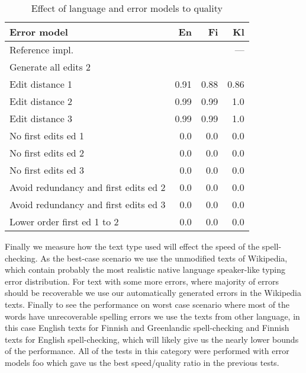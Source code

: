 \documentclass[11pt]{article}
\begin{document}
\begin{table}[h]
\begin{center}
\begin{scriptsize}
\begin{tabular}{|l|rrr|}
\hline
\bf Error model & \bf En & \bf Fi & \bf Kl\\ 
\hline
Reference impl.   & & & --- \\
Generate all edits 2 &
\\
\hline
Edit distance 1 &
0.91&0.88&0.86
\\
Edit distance 2 &
0.99&0.99&1.0
\\
Edit distance 3 &
0.99&0.99&1.0
\\
No first edits ed 1 & 
0.0&0.0&0.0
\\
No first edits ed 2 &
0.0&0.0&0.0
\\
No first edits ed 3 &
0.0&0.0&0.0
\\
Avoid redundancy and first edits ed 2 &
0.0&0.0&0.0
\\
Avoid redundancy and first edits ed 3 &
0.0&0.0&0.0
\\
Lower order first ed 1 to 2 &
0.0&0.0&0.0
\\
\hline
\end{tabular}
\end{scriptsize}
\end{center}
\caption{\label{table:error-model-vs-language} Effect of language and 
error models to quality}
\end{table}

Finally we measure how the text type used will effect the speed of the
spell-checking. As the best-case scenario we use the unmodified texts of
Wikipedia, which contain probably the most realistic native language
speaker-like typing error distribution. For text with some more errors, where
majority of errors should be recoverable we use our automatically generated
errors in the Wikipedia texts. Finally to see the performance on worst case
scenario where most of the words have unrecoverable spelling errors we use the
texts from other language, in this case English texts for Finnish and 
Greenlandic spell-checking and Finnish texts for English spell-checking, which
will likely give us the nearly lower bounds of the performance. All of the
tests in this category were performed with error models foo which gave us 
the best speed/quality ratio in the previous tests.
\end{document}
